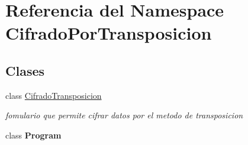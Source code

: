 \hypertarget{namespace_cifrado_por_transposicion}{}\section{Referencia del Namespace Cifrado\+Por\+Transposicion}
\label{namespace_cifrado_por_transposicion}
\subsection*{Clases}
\begin{DoxyCompactItemize}
\item 
class \hyperlink{class_cifrado_por_transposicion_1_1_cifrado_transposicion}{Cifrado\+Transposicion}
\begin{DoxyCompactList}\small\item\em fomulario que permite cifrar datos por el metodo de transposicion \end{DoxyCompactList}\item 
class {\bfseries Program}
\end{DoxyCompactItemize}
